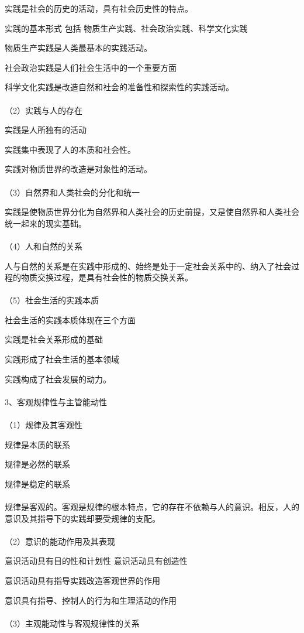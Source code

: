 \documentclass{ctexart}
\begin{document}
实践是社会的历史的活动，具有社会历史性的特点。

实践的基本形式 包括 物质生产实践、社会政治实践、科学文化实践

物质生产实践是人类最基本的实践活动。

社会政治实践是人们社会生活中的一个重要方面

科学文化实践是改造自然和社会的准备性和探索性的实践活动。
\\\\
（2）实践与人的存在

实践是人所独有的活动

实践集中表现了人的本质和社会性。

实践对物质世界的改造是对象性的活动。
\\\\
（3）自然界和人类社会的分化和统一

实践是使物质世界分化为自然界和人类社会的历史前提，又是使自然界和人类社会统一起来的现实基础。
\\\\
（4）人和自然的关系

人与自然的关系是在实践中形成的、始终是处于一定社会关系中的、纳入了社会过程的物质交换过程，是具有社会性的物质交换关系。
\\\\
（5）社会生活的实践本质

社会生活的实践本质体现在三个方面

实践是社会关系形成的基础

实践形成了社会生活的基本领域

实践构成了社会发展的动力。
\\\\

3、客观规律性与主管能动性\\\\
（1）规律及其客观性

规律是本质的联系

规律是必然的联系

规律是稳定的联系
\\\\
规律是客观的。客观是规律的根本特点，它的存在不依赖与人的意识。相反，人的意识及其指导下的实践却要受规律的支配。
\\\\
（2）意识的能动作用及其表现

意识活动具有目的性和计划性
意识活动具有创造性

意识活动具有指导实践改造客观世界的作用

意识具有指导、控制人的行为和生理活动的作用
\\\\
（3）主观能动性与客观规律性的关系
\end{document}

